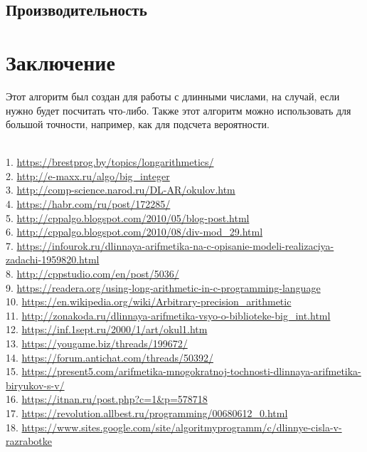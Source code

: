 \documentclass[a4paper]{article}
\begin{document}
\subsection{Производительность}
\newpage

\section{Заключение}
Этот алгоритм был создан для работы с длинными числами, на случай, если нужно будет посчитать что-либо. Также этот алгоритм можно использовать для большой точности, например, как для подсчета вероятности.
\newpage



\begin{flushleft}
\\
1. \url{https://brestprog.by/topics/longarithmetics/}\\
2. \url{http://e-maxx.ru/algo/big_integer}\\
3. \url{http://comp-science.narod.ru/DL-AR/okulov.htm}\\
4. \url{https://habr.com/ru/post/172285/}\\
5. \url{http://cppalgo.blogspot.com/2010/05/blog-post.html}\\
6. \url{http://cppalgo.blogspot.com/2010/08/div-mod_29.html}\\
7. \url{https://infourok.ru/dlinnaya-arifmetika-na-c-opisanie-modeli-realizaciya-zadachi-1959820.html}\\
8. \url{http://cppstudio.com/en/post/5036/}\\
9. \url{https://readera.org/using-long-arithmetic-in-c-programming-language}\\
10. \url{https://en.wikipedia.org/wiki/Arbitrary-precision_arithmetic}\\
11. \url{http://zonakoda.ru/dlinnaya-arifmetika-vsyo-o-biblioteke-big_int.html}\\
12. \url{https://inf.1sept.ru/2000/1/art/okul1.htm}\\
13. \url{https://yougame.biz/threads/199672/}\\
14. \url{https://forum.antichat.com/threads/50392/}\\
15. \url{https://present5.com/arifmetika-mnogokratnoj-tochnosti-dlinnaya-arifmetika-biryukov-s-v/}\\
16. \url{https://itnan.ru/post.php?c=1&p=578718}\\
17. \url{https://revolution.allbest.ru/programming/00680612_0.html}\\
18. \url{https://www.sites.google.com/site/algoritmyprogramm/c/dlinnye-cisla-v-razrabotke}\\

\end{flushleft}
\end{document}

